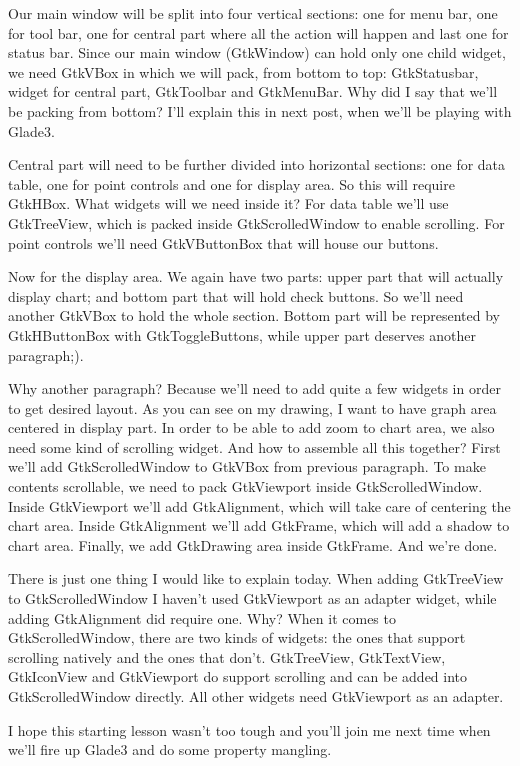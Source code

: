 \documentclass[a4paper,openany,twoside,final]{book}
\begin{document}
Our main window will be split into four vertical sections: one for menu bar, one for tool bar, one for central part where all the action will happen and last one for status bar. Since our main window (GtkWindow) can hold only one child widget, we need GtkVBox in which we will pack, from bottom to top: GtkStatusbar, widget for central part, GtkToolbar and GtkMenuBar. Why did I say that we'll be packing from bottom? I'll explain this in next post, when we'll be playing with Glade3.

Central part will need to be further divided into horizontal sections: one for data table, one for point controls and one for display area. So this will require GtkHBox. What widgets will we need inside it? For data table we'll use GtkTreeView, which is packed inside GtkScrolledWindow to enable scrolling. For point controls we'll need GtkVButtonBox that will house our buttons.

Now for the display area. We again have two parts: upper part that will actually display chart; and bottom part that will hold check buttons. So we'll need another GtkVBox to hold the whole section. Bottom part will be represented by GtkHButtonBox with GtkToggleButtons, while upper part deserves another paragraph;).

Why another paragraph? Because we'll need to add quite a few widgets in order to get desired layout. As you can see on my drawing, I want to have graph area centered in display part. In order to be able to add zoom to chart area, we also need some kind of scrolling widget. And how to assemble all this together? First we'll add GtkScrolledWindow to GtkVBox from previous paragraph. To make contents scrollable, we need to pack GtkViewport inside GtkScrolledWindow. Inside GtkViewport we'll add GtkAlignment, which will take care of centering the chart area. Inside GtkAlignment we'll add GtkFrame, which will add a shadow to chart area. Finally, we add GtkDrawing area inside GtkFrame. And we're done.

There is just one thing I would like to explain today. When adding GtkTreeView to GtkScrolledWindow I haven't used GtkViewport as an adapter widget, while adding GtkAlignment did require one. Why? When it comes to GtkScrolledWindow, there are two kinds of widgets: the ones that support scrolling natively and the ones that don't. GtkTreeView, GtkTextView, GtkIconView and GtkViewport do support scrolling and can be added into GtkScrolledWindow directly. All other widgets need GtkViewport as an adapter.

I hope this starting lesson wasn't too tough and you'll join me next time when we'll fire up Glade3 and do some property mangling.
\end{document}
